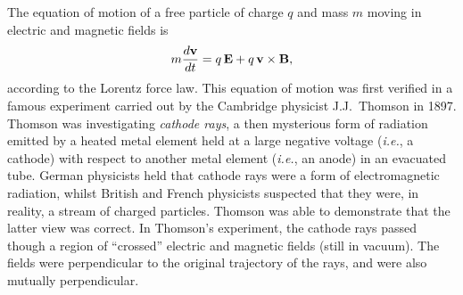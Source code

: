 The
equation of motion of a free particle of charge $q$ and
mass $m$ moving in electric and
magnetic fields is
\begin{equation} \label{e3.75}
m\frac{d{\bf v}}{dt} = q\,{\bf E} + q\,{\bf v} \times{\bf B},
\end{equation}
according to the Lorentz force law.
This equation of motion was first verified in a famous experiment carried out
by the Cambridge physicist J.J.~Thomson in 1897. Thomson was investigating
{\em cathode rays}, a then mysterious form of radiation emitted by a heated
metal element held at a large negative voltage ({\em i.e.}, a cathode) with respect
to another metal element ({\em i.e.}, an anode)  in an evacuated tube. 
German physicists held that cathode rays were
a form of electromagnetic radiation, whilst British and French physicists suspected
that they were, in reality, a stream of charged particles. Thomson was able to
demonstrate that the latter view was correct. In Thomson's experiment, the
cathode rays passed though a region of ``crossed'' electric and magnetic
fields (still in vacuum). The fields were perpendicular to the original
trajectory of the rays, and were also mutually perpendicular.

